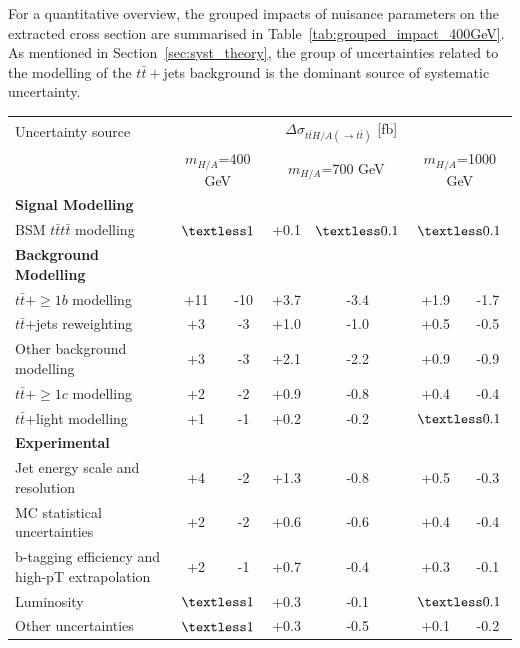 For a quantitative overview, the grouped impacts of nuisance parameters on the extracted cross section are summarised in Table~\ref{tab:grouped_impact_400GeV}. 
As mentioned in Section~\ref{sec:syst_theory}, the group of uncertainties related to the modelling of the $t\bar{t}+$jets background is the dominant source of systematic uncertainty.

\begin{table}[htbp!]
    \begin{center}
    \begin{tabular}{lcc|cc|cc}
    \hline \hline
    Uncertainty source & \multicolumn{6}{c}{$\Delta\sigma_{t\bar{t}H/A(\rightarrow t\bar{t})}$ [fb]} \\
    & \multicolumn{2}{c}{$m_{H/A}$=400 GeV} & \multicolumn{2}{c}{$m_{H/A}$=700 GeV} & \multicolumn{2}{c}{$m_{H/A}$=1000 GeV} \\
    \hline
    \textbf{Signal Modelling} & & & & & & \\
    BSM $t\bar{t}t\bar{t}$ modelling & \multicolumn{2}{c}{$\textless 1$} & +0.1 & $\textless 0.1$ & \multicolumn{2}{c}{$\textless 0.1$} \\
    \hline
    \textbf{Background Modelling} & & & & & & \\
    $t\bar{t}+\geq1b$ modelling & +11 & -10 & +3.7 & -3.4 & +1.9 & -1.7 \\
    $t\bar{t}$+jets reweighting & +3 & -3 & +1.0 & -1.0 & +0.5 & -0.5 \\
    Other background modelling & +3 & -3 & +2.1 & -2.2 & +0.9 & -0.9 \\
    $t\bar{t}+\geq1c$ modelling & +2 & -2 & +0.9 & -0.8 & +0.4 & -0.4 \\
    $t\bar{t}$+light modelling & +1 & -1 & +0.2 & -0.2 & \multicolumn{2}{c}{$\textless 0.1$} \\
    \hline
    \textbf{Experimental} & & & & & & \\
    Jet energy scale and resolution & +4 & -2 & +1.3 & -0.8 & +0.5 & -0.3 \\
    MC statistical uncertainties & +2 & -2 & +0.6 & -0.6 & +0.4 & -0.4 \\
    b-tagging efficiency and high-pT extrapolation & +2 & -1 & +0.7 & -0.4 & +0.3 & -0.1 \\
    Luminosity & \multicolumn{2}{c}{$\textless 1$} & +0.3 & -0.1 & \multicolumn{2}{c}{$\textless 0.1$} \\
    Other uncertainties & \multicolumn{2}{c}{$\textless 1$} & +0.3 & -0.5 & +0.1 & -0.2 \\

\end{tabular}
\end{center}
\end{table}
